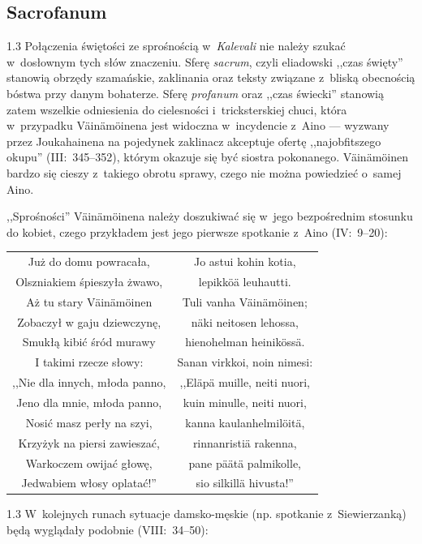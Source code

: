 \documentclass[11pt,a4paper,twoside]{report}
\begin{document}
\vspace*{0.5\baselineskip}
\subsection*{Sacrofanum}
\begin{spacing}{1.3}
Połączenia świętości ze sprośnością w~\emph{Kalevali} nie należy szukać w~dosłownym tych słów znaczeniu. Sferę \emph{sacrum}, czyli eliadowski ,,czas święty'' stanowią obrzędy szamańskie, zaklinania oraz teksty związane z~bliską obecnością bóstwa przy danym bohaterze. Sferę \emph{profanum} oraz ,,czas świecki'' stanowią zatem wszelkie odniesienia do cielesności i~tricksterskiej chuci, która w~przypadku Väinämöinena jest widoczna w~incydencie z~Aino --- wyzwany przez Joukahainena na pojedynek zaklinacz akceptuje ofertę ,,najobfitszego okupu'' (III:~345--352), którym okazuje się być siostra pokonanego. Väinämöinen bardzo się cieszy z~takiego obrotu sprawy, czego nie można powiedzieć o~samej Aino.

,,Sprośności'' Väinämöinena należy doszukiwać się w~jego bezpośrednim stosunku do kobiet, czego przykładem jest jego pierwsze spotkanie z~Aino (IV:~9--20):
\end{spacing}
{\centering
\small
\begin{longtable}{c c}
Już do domu powracała, & Jo astui kohin kotia,\\
Olszniakiem śpieszyła żwawo, & lepikköä leuhautti.\\
Aż tu stary Väinämöinen & Tuli vanha Väinämöinen;\\
Zobaczył w gaju dziewczynę, & näki neitosen lehossa,\\
Smukłą kibić śród murawy & hienohelman heinikössä.\\
I takimi rzecze słowy: & Sanan virkkoi, noin nimesi:\\
,,Nie dla innych, młoda panno, & ,,Eläpä muille, neiti nuori,\\
Jeno dla mnie, młoda panno, & kuin minulle, neiti nuori,\\
Nosić masz perły na szyi, & kanna kaulanhelmilöitä,\\
Krzyżyk na piersi zawieszać, & rinnanristiä rakenna,\\
Warkoczem owijać głowę, & pane päätä palmikolle,\\
Jedwabiem włosy oplatać!'' & sio silkillä hivusta!''\\
\end{longtable}
}
\begin{spacing}{1.3}
W~kolejnych runach sytuacje damsko-męskie (np. spotkanie z~Siewierzanką) będą wyglądały podobnie (VIII:~34--50):
\end{spacing}
\end{document}
